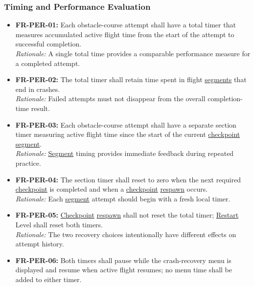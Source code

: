 \documentclass[12pt]{article}
\begin{document}
\subsubsection{Timing and Performance Evaluation}
\label{sec:s2-performance}
\begin{itemize}
\item \hypertarget{req:FR-PER-01}{}\textbf{FR-PER-01:} Each obstacle-course attempt shall have a total timer that measures accumulated active flight time from the start of the attempt to successful completion.\\
\textit{Rationale:} A single total time provides a comparable performance measure for a completed attempt.
\item \hypertarget{req:FR-PER-02}{}\textbf{FR-PER-02:} The total timer shall retain time spent in flight \hyperlink{glos:Checkpoint}{segments} that end in crashes.\\
\textit{Rationale:} Failed attempts must not disappear from the overall completion-time result.
\item \hypertarget{req:FR-PER-03}{}\textbf{FR-PER-03:} Each obstacle-course attempt shall have a separate section timer measuring active flight time since the start of the current \hyperlink{glos:Checkpoint}{checkpoint} \hyperlink{glos:Checkpoint}{segment}.\\
\textit{Rationale:} \hyperlink{glos:Checkpoint}{Segment} timing provides immediate feedback during repeated practice.
\item \hypertarget{req:FR-PER-04}{}\textbf{FR-PER-04:} The section timer shall reset to zero when the next required \hyperlink{glos:Checkpoint}{checkpoint} is completed and when a \hyperlink{glos:Checkpoint}{checkpoint} \hyperlink{glos:Respawn}{respawn} occurs.\\
\textit{Rationale:} Each \hyperlink{glos:Checkpoint}{segment} attempt should begin with a fresh local timer.
\item \hypertarget{req:FR-PER-05}{}\textbf{FR-PER-05:} \hyperlink{glos:Checkpoint}{Checkpoint} \hyperlink{glos:Respawn}{respawn} shall not reset the total timer; \hyperlink{glos:Respawn}{Restart} Level shall reset both timers.\\
\textit{Rationale:} The two recovery choices intentionally have different effects on attempt history.
\item \hypertarget{req:FR-PER-06}{}\textbf{FR-PER-06:} Both timers shall pause while the crash-recovery menu is displayed and resume when active flight resumes; no menu time shall be added to either timer.\\

\end{itemize}
\end{document}
